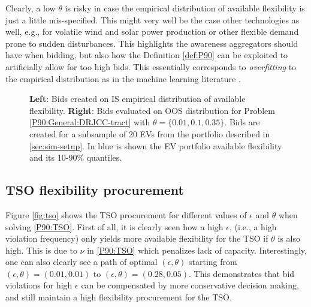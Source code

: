 \documentclass[conference]{IEEEtran}
\begin{document}
Clearly, a low $\theta$ is risky in case the empirical distribution of available flexibility is just a little mis-specified. This might very well be the case other technologies as well, e.g., for volatile wind and solar power production or other flexible demand prone to sudden disturbances. This highlights the awareness aggregators should have when bidding, but also how the Definition \ref{def:P90} can be exploited to artificially allow for too high bids. This essentially corresponds to \textit{overfitting} to the empirical distribution as in the machine learning literature \cite{bishop2006pattern}.

\begin{figure}[!t]
    \centering
    \begin{adjustbox}{width=\columnwidth}
        
    \end{adjustbox}
    \caption{\textbf{Left}: Bids created on \ac{IS} empirical distribution of available flexibility. \textbf{Right}: Bids evaluated on \ac{OOS} distribution for Problem \eqref{P90:General:DRJCC-tract} with $\theta = \{0.01, 0.1, 0.35\}$. Bids are created for a subsample of 20 \acp{EV} from the portfolio described in \ref{sec:sim-setup}. In blue is shown the \ac{EV} portfolio available flexibility and its 10-90\% quantiles.}
    \label{fig:drjcc_bids}
\end{figure}



\subsection{\ac{TSO} flexibility procurement}\label{sec:motivation}

Figure \ref{fig:tso} shows the \ac{TSO} procurement for different values of $\epsilon$ and $\theta$ when solving \eqref{P90:TSO}. First of all, it is clearly seen how a high $\epsilon$, (i.e., a high violation frequency) only yields more available flexibility for the \ac{TSO} if $\theta$ is also high. This is due to $\nu$ in \eqref{P90:TSO} which penalizes lack of capacity. Interestingly, one can also clearly see a path of optimal $(\epsilon, \theta)$ starting from $(\epsilon, \theta) = (0.01, 0.01)$ to $(\epsilon, \theta) = (0.28, 0.05)$. This demonstrates that bid violations for high $\epsilon$ can be compensated by more conservative decision making, and still maintain a high flexibility procurement for the \ac{TSO}.
\end{document}
